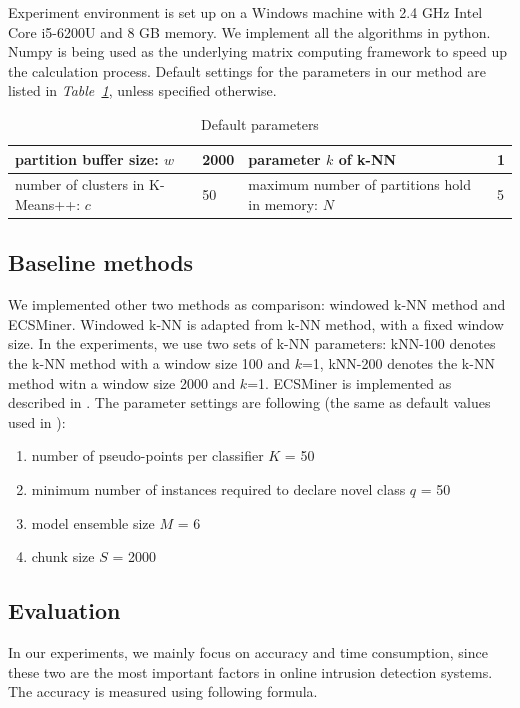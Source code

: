 \documentclass[runningheads]{llncs}
\begin{document}
	Experiment environment is set up on a Windows machine with 2.4 GHz Intel Core i5-6200U and 8 GB memory. We implement all the algorithms in python. Numpy is being used as the underlying matrix computing framework to speed up the calculation process. Default settings for the parameters in our method are listed in \textit{Table~\ref{table:parameters}}, unless specified otherwise.
	
	\begin{table}
		\centering
		\caption{Default parameters}\label{table:parameters}
		\begin{tabular}{|m{14em}|m{4em}|m{14em}|m{4em}|}
			\hline
			partition buffer size: $w$ & 2000 & parameter $k$ of k-NN & 1 \\
			\hline
			number of clusters in K-Means++: $c$ & 50 & maximum number of partitions hold in memory: $N$ & 5 \\ 
			\hline
		\end{tabular}
	\end{table} 
	\subsection{Baseline methods}
	
	We implemented other two methods as comparison: windowed k-NN method and ECSMiner. Windowed k-NN is adapted from k-NN method, with a fixed window size. In the experiments, we use two sets of k-NN parameters: kNN-100 denotes the k-NN method with a window size 100 and $k$=1, kNN-200 denotes the k-NN method witn a window size 2000 and $k$=1. ECSMiner is implemented as described in \cite{Masud2011}. The parameter settings are following (the same as default values used in \cite{Masud2011}):
	\begin{enumerate}
		\item number of pseudo-points per classifier $K$ = 50
		\item minimum number of instances required to declare novel class $q$ = 50
		\item model ensemble size $M$ = 6
		\item chunk size $S$ = 2000
	\end{enumerate}
	
	
	\subsection{Evaluation}
	
	In our experiments, we mainly focus on accuracy and time consumption, since these two are the most important factors in online intrusion detection systems. The accuracy is measured using following formula.
	
\end{document}
